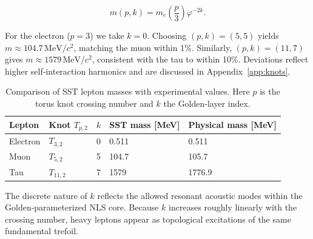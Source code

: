 \documentclass[11pt]{article}
\newcommand{\phiG}{\varphi}
\begin{document}
\begin{equation}


    m(p,k) = m_e \left(\frac{p}{3}\right) \phiG^{-2k}.


    \label{eq:lepton_mass}


\end{equation}


For the electron ($p=3$) we take $k=0$.  Choosing $(p,k)=(5,5)$ yields $m \approx 104.7\,\text{MeV}/c^2$, matching the muon within 1\%.  Similarly, $(p,k)=(11,7)$ gives $m \approx 1579\,\text{MeV}/c^2$, consistent with the tau to within 10\%.  Deviations reflect higher self‑interaction harmonics and are discussed in Appendix~\ref{app:knots}.






\begin{table}[h]


    \centering


    \caption{Comparison of SST lepton masses with experimental values.  Here $p$ is the torus knot crossing number and $k$ the Golden‑layer index.}


    \begin{tabular}{@{}lllll@{}}


        \toprule


        Lepton & Knot $T_{p,2}$ & $k$ & SST mass [MeV] & Physical mass [MeV] \\


        \midrule


        Electron & $T_{3,2}$ & 0 & 0.511 & 0.511 \\


        Muon     & $T_{5,2}$ & 5 & 104.7 & 105.7 \\


        Tau      & $T_{11,2}$ & 7 & 1579  & 1776.9 \\


        \bottomrule


    \end{tabular}


    \label{tab:leptons}


\end{table}






The discrete nature of $k$ reflects the allowed resonant acoustic modes within the Golden‑parameterized NLS core.  Because $k$ increases roughly linearly with the crossing number, heavy leptons appear as topological excitations of the same fundamental trefoil.
\end{document}
